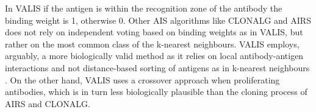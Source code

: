 In VALIS if the antigen is within the recognition zone of the antibody the binding weight is 1, otherwise 0. Other AIS algorithms like CLONALG and AIRS does not rely on independent voting based on binding weights as in VALIS, but rather on the most common class of the k-nearest neighbours. VALIS employs, arguably, a more biologically valid method as it relies on local antibody-antigen interactions and not distance-based sorting of antigens as in k-nearest neighbours \cite{process:valis}. On the other hand, VALIS uses a crossover approach when proliferating antibodies, which is in turn less biologically plausible than the cloning process of AIRS and CLONALG.



